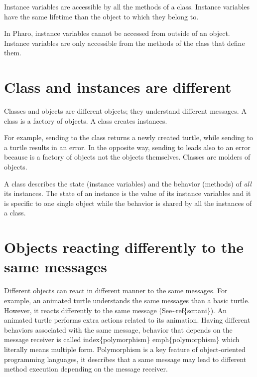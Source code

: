 \documentclass[10pt,twoside,english]{_support/latex/sbabook/sbabook}
\begin{document}
\begin{important}
Instance variables are accessible by all the methods of a class. Instance variables have the same lifetime than the object to which they belong to.
\end{important}

\begin{important}
In Pharo, instance variables cannot be accessed from outside of an object. Instance variables are only accessible from the methods of the class that define them.
\end{important}
\section{Class and instances are different}
Classes and objects are different objects; they understand different messages. A class is a factory of objects. A class creates instances.

For example, sending  to the  class returns a newly created turtle, while sending  to a turtle results in an error. In the opposite way, sending  to  leads also to an error because  is a factory of objects not the objects themselves. Classes are molders of objects.

\begin{important}
A class describes the state (instance variables) and the behavior (methods) of \textit{all} its instances. The state of an instance is the value of its instance variables and it is specific to one single object while the behavior is shared by all the instances of a class.
\end{important}
\section{Objects reacting differently to the same messages}
Different objects can react in different manner to the same messages.  For example, an animated turtle understands the same messages than a basic turtle. However, it reacts differently to the same message (See\textasciitilde{}ref\{scr:ani\}). An animated turtle performs extra actions related to its animation. Having different behaviors associated with the same message, behavior that  depends on the message receiver is called index\{polymorphism\} emph\{polymorphism\} which literally means multiple form. Polymorphism is a key feature of object-oriented programming languages, it describes that a same message may lead to different method execution depending on the message receiver.
\end{document}
